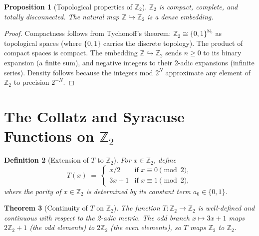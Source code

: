 \documentclass[12pt,a4paper]{article}
\newtheorem{theorem}{Theorem}[section]
\newtheorem{proposition}[theorem]{Proposition}
\newtheorem{definition}[theorem]{Definition}
\begin{document}
\begin{proposition}[Topological properties of $\mathbb{Z}_2$]\label{prop:topology}
$\mathbb{Z}_2$ is compact, complete, and totally disconnected. The natural map
$\mathbb{Z} \hookrightarrow \mathbb{Z}_2$ is a dense embedding.
\end{proposition}

\begin{proof}
Compactness follows from Tychonoff's theorem: $\mathbb{Z}_2 \cong \{0,1\}^{\mathbb{N}_0}$
as topological spaces (where $\{0,1\}$ carries the discrete topology). The product of
compact spaces is compact. The embedding $\mathbb{Z} \hookrightarrow \mathbb{Z}_2$ sends
$n \geq 0$ to its binary expansion (a finite sum), and negative integers to their 2-adic
expansions (infinite series). Density follows because the integers mod $2^N$ approximate
any element of $\mathbb{Z}_2$ to precision $2^{-N}$.
\end{proof}

\section{The Collatz and Syracuse Functions on $\mathbb{Z}_2$}\label{sec:collatz_2adic}

\begin{definition}[Extension of $T$ to $\mathbb{Z}_2$]\label{def:T_ext}
For $x \in \mathbb{Z}_2$, define
\[
  T(x) \;=\; \begin{cases} x/2 & \text{if } x \equiv 0 \pmod{2}, \\
                            3x+1 & \text{if } x \equiv 1 \pmod{2},
              \end{cases}
\]
where the parity of $x \in \mathbb{Z}_2$ is determined by its constant term $a_0 \in \{0,1\}$.
\end{definition}

\begin{theorem}[Continuity of $T$ on $\mathbb{Z}_2$]\label{thm:continuous}
The function $T\colon \mathbb{Z}_2 \to \mathbb{Z}_2$ is well-defined and continuous with
respect to the 2-adic metric. The odd branch $x \mapsto 3x+1$ maps $2\mathbb{Z}_2 + 1$
(the odd elements) to $2\mathbb{Z}_2$ (the even elements), so $T$ maps $\mathbb{Z}_2$
to $\mathbb{Z}_2$.
\end{theorem}
\end{document}
